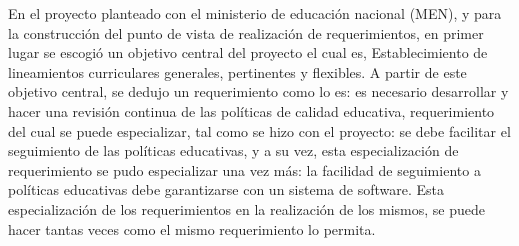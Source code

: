 En el proyecto planteado con el ministerio de educación nacional (MEN), y para la construcción del punto de vista de realización de requerimientos, en primer lugar se escogió un objetivo central del proyecto el cual es, Establecimiento de lineamientos curriculares generales, pertinentes y flexibles. A partir de este objetivo central, se dedujo un requerimiento como lo es: es necesario desarrollar y hacer una revisión continua de las políticas de calidad educativa, requerimiento del cual se puede especializar, tal como se hizo con el proyecto: se debe facilitar el seguimiento de las políticas educativas, y a su vez, esta especialización de requerimiento se pudo especializar una vez más: la facilidad de seguimiento a políticas educativas debe garantizarse con un sistema de software. Esta especialización de los requerimientos en la realización de los mismos, se puede hacer tantas veces como el mismo requerimiento lo permita.
